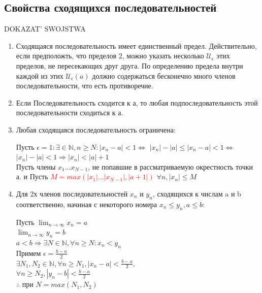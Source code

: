 \documentclass[oneside]{book}
\begin{document}
\begin{enumerate}
\section[Свойства]{Свойства сходящихся последовательностей}
{\LARGE{DOKAZAT' SWOJSTWA}}
\begin{enumerate}
    \item Сходящаяся последовательность имеет единственный предел. Действительно, если предположть,
          что пределов 2, можно указать несколько $\mathcal{U}_\epsilon$ этих пределов, не пересекающих
          друг друга. По определению предела внутри каждой из этих  $\mathcal{U}_\epsilon(a)$ должно
          содержаться бесконечно много членов последовательности, что есть противоречие.
    \item Если Последовательность сходится к а, то любая подпоследовательность этой последовательности сходиться к а.
    \item Любая сходящаяся последовательность ограничена: \begin{center}
        Пусть $\epsilon = 1: \exists \in \mathbb{N}, n \geq N: |x_n - a| < 1 \Leftrightarrow$
        $|x_n| - |a| \leq |x_n - a| < 1 \Leftrightarrow$ \\
        $|x_n| - |a| < 1 \Rightarrow |x_n| < |a| + 1$ \\
        Пусть члены $x_1 \dots x_{N-1}$, не попавшие в рассматриваемую окрестность точки а. и Пусть
        \textcolor{red}{$M = max(|x_1| \dots |x_{N-1}|, |a+1|)$} $\forall n, |x_n| \leq M$
        \end{center}
    \item Для 2х членов последовательностей ${x_n}$ и ${y_n}$, сходящихся к числам a и b
          соответственно, начиная с некоторого номера $ x_n \leq y_n, a \leq b$: \begin{center}
                Пусть $\lim_{n \rightarrow \infty}{x_n = a}$ \\$\lim_{n \rightarrow \infty}{y_n = b}$ \\
                $a < b \Rightarrow \exists N \in \mathbb{N}, \forall n \geq N: x_n < y_n$ \\
                Примем $\epsilon = \frac{b-a}{2}$ \\
                $\exists N_1, N_2 \in \mathbb{N}, \forall n \geq N_1, |x_n - a| < \frac{b-a}{2},$ \\
                                                  $\forall n \geq N_2, |y_n - b| < \frac{b-a}{2}$ \\
            $\therefore$ при $N = max(N_1, N_2)$ \\

\end{center}
\end{enumerate}
\end{enumerate}
\end{document}
